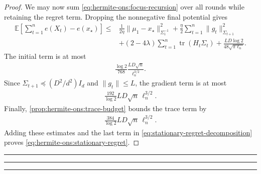 \documentclass{article}
\theoremstyle{plain}
\theoremstyle{definition}
\theoremstyle{plain}
\newcommand{\tr}{\operatorname{tr}}
\newcommand{\E}{\mathbb E}
\begin{document}
\begin{proof}
    We may now sum
    \eqref{eq:hermite-ons:focus-recursion} over all rounds while
    retaining the regret term. Dropping the nonnegative final
    potential gives
    \begin{align}
        \E\left[
            \sum_{t=1}^n e(X_t)-e(x_\star)
            \right]
        \leq{} &
        \frac{1}{2\eta}
        \|\mu_1-x_\star\|_{\Sigma_1^{-1}}^2
        +
        \frac{\eta}{2}
        \sum_{t=1}^n
        \|g_t\|_{\Sigma_{t+1}}^2
        \nonumber  \\
               & +
        (2-4\lambda)
        \sum_{t=1}^n\tr(H_t\Sigma_t)
        +
        \frac{LD\log2}{48\sqrt{\pi\ell_n}}.
        \label{eq:stationary-regret-decomposition}
    \end{align}
    The initial term is at most
    \begin{align}
        \frac{\log2}{768}
        \frac{LD\sqrt n}{\ell_n^{3/2}}.
    \end{align}
    Since $\Sigma_{t+1}\preceq(D^2/d^2)I_d$ and
    $\|g_t\|\leq L$, the gradient term is at most
    \begin{align}
        \frac{192}{\log2}
        LD\sqrt n\,\ell_n^{3/2}.
    \end{align}
    Finally, \cref{prop:hermite-ons:trace-budget} bounds the trace
    term by
    \begin{align}
        \frac{384}{\log2}
        LD\sqrt n\,\ell_n^{3/2}.
    \end{align}
    Adding these estimates and the last term in
    \eqref{eq:stationary-regret-decomposition} proves
    \eqref{eq:hermite-ons:stationary-regret}.
\end{proof}



















\newpage
\hrule
\hrule
\hrule
\end{document}
